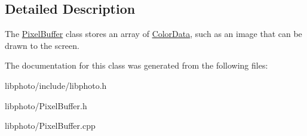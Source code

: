 \subsection{Detailed Description}
The \hyperlink{classPixelBuffer}{Pixel\-Buffer} class stores an array of \hyperlink{classColorData}{Color\-Data}, such as an image that can be drawn to the screen. 

The documentation for this class was generated from the following files\-:\begin{DoxyCompactItemize}
\item 
libphoto/include/libphoto.\-h\item 
libphoto/Pixel\-Buffer.\-h\item 
libphoto/Pixel\-Buffer.\-cpp\end{DoxyCompactItemize}
